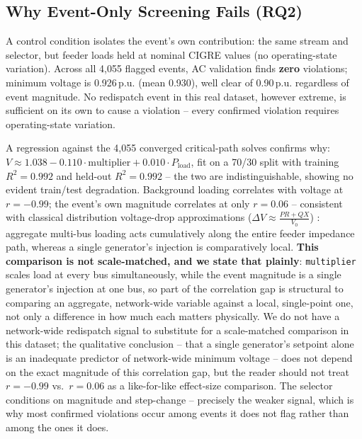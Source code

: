 \documentclass[11pt,conference]{IEEEtran}
\begin{document}
\subsection{Why Event-Only Screening Fails (RQ2)}
\label{sec:why_fails}
A control condition isolates the event's own contribution: the same stream and selector, but feeder
loads held at nominal CIGRE values (no operating-state variation). Across all 4,055 flagged events,
AC validation finds \textbf{zero} violations; minimum voltage is 0.926\,p.u. (mean 0.930), well
clear of 0.90\,p.u. regardless of event magnitude. No redispatch event in this real dataset, however
extreme, is sufficient on its own to cause a violation -- every confirmed violation requires
operating-state variation.

A regression against the 4,055 converged critical-path solves confirms why: $V \approx 1.038 -
0.110\cdot\text{multiplier} + 0.010\cdot P_{\mathrm{load}}$, fit on a 70/30 split with training
$R^2=0.992$ and held-out $R^2=0.992$ -- the two are indistinguishable, %
showing no evident train/test degradation. Background loading correlates with voltage at $r=-0.99$;
the event's own magnitude correlates at only $r=0.06$ -- consistent with classical distribution
voltage-drop approximations ($\Delta V \approx \frac{PR+QX}{V_0}$) \cite{ref:baran_wu1989}:
aggregate multi-bus loading acts cumulatively along the entire feeder impedance path, whereas a
single generator's injection is comparatively local. \textbf{This comparison is not scale-matched,
and we state that plainly}: \texttt{multiplier} scales load at every bus simultaneously, while the
event magnitude is a single generator's injection at one bus, so part of the correlation gap is
structural to comparing an aggregate, network-wide variable against a local, single-point one, not
only a difference in how much each matters physically. We do not have a network-wide redispatch
signal to substitute for a scale-matched comparison in this dataset; the qualitative conclusion --
that a single generator's setpoint alone is an inadequate predictor of network-wide minimum
voltage -- does not depend on the exact magnitude of this correlation gap, but the reader should
not treat $r=-0.99$ vs.\ $r=0.06$ as a like-for-like effect-size comparison. The selector conditions
on magnitude and step-change -- precisely the weaker signal, which is why most confirmed violations
occur among events it does not flag rather than among the ones it does.
\end{document}
